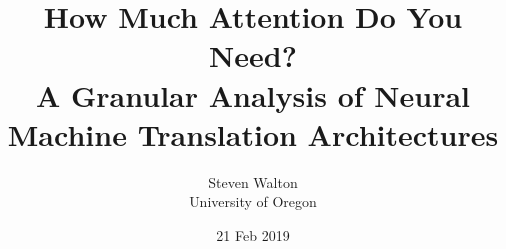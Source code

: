 \documentclass[pdf,11pt]{beamer}
\title{How Much Attention Do You Need?\\
    \small A Granular Analysis of Neural Machine Translation Architectures
}
\author{Steven Walton\\ \small University of Oregon}
\date{21 Feb 2019}
\begin{document}
\frame{\titlepage}






\end{document}
